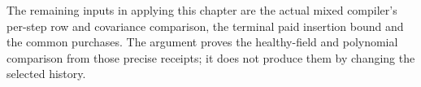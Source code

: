 The remaining inputs in applying this chapter are the actual mixed
compiler's per-step row and covariance comparison, the terminal paid
insertion bound and the common purchases. The argument proves the
healthy-field and polynomial comparison from those precise receipts;
it does not produce them by changing the selected history.
